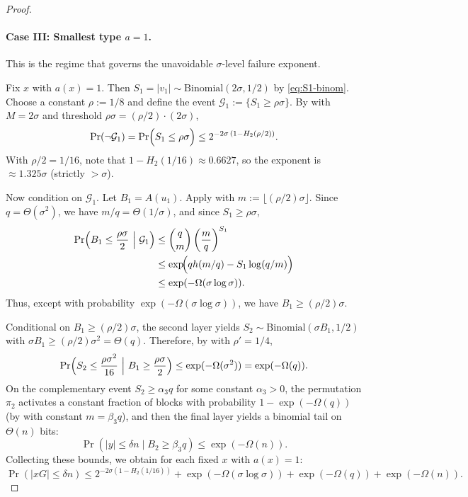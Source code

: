 \begin{proof}
\paragraph{Case III: Smallest type $a=1$.}
This is the regime that governs the unavoidable $\sigma$-level failure exponent.

Fix $x$ with $a(x)=1$.
Then $S_1=|v_1|\sim \mathrm{Binomial}(2\sigma,1/2)$ by \eqref{eq:S1-binom}.
Choose a constant $\rho:=1/8$ and define the event $\mathcal G_1:=\{S_1\ge \rho\sigma\}$.
By  with $M=2\sigma$ and threshold $\rho\sigma = (\rho/2)\cdot(2\sigma)$,
\begin{equation}\label{eq:caseIII_S1small}
\Pr(\neg \mathcal G_1)
=\Pr\Bigl(S_1\le \rho\sigma\Bigr)
\le 2^{-2\sigma\,(1-H_2(\rho/2))}.
\end{equation}
With $\rho/2=1/16$, note that $1-H_2(1/16)\approx 0.6627$, so the exponent is $\approx 1.325\sigma$ (strictly $> \sigma$).

Now condition on $\mathcal G_1$.
Let $B_1=A(u_1)$.
Apply  with $m:=\lfloor (\rho/2)\sigma\rfloor$.
Since $q=\Theta(\sigma^2)$, we have $m/q=\Theta(1/\sigma)$, and since $S_1\ge \rho\sigma$,
\begin{align*}
\Pr\Bigl(B_1 \le \frac{\rho\sigma}{2} \ \Big|\ \mathcal{G}_1\Bigr)
    &\le \binom{q}{m} \left(\frac{m}{q}\right)^{S_1} \\
    &\le \exp\!\Bigl( qh(m/q) - S_1 \log(q/m) \Bigr) \\
    &\le \exp(-\Omega(\sigma \log \sigma)).
\end{align*}
Thus, except with probability $\exp(-\Omega(\sigma\log\sigma))$, we have $B_1\ge (\rho/2)\sigma$.

Conditional on $B_1\ge (\rho/2)\sigma$, the second layer yields
$S_2\sim \mathrm{Binomial}(\sigma B_1,1/2)$ with $\sigma B_1\ge (\rho/2)\sigma^2=\Theta(q)$.
Therefore, by  with $\rho'=1/4$,
\[
\Pr\Bigl(S_2\le \frac{\rho\sigma^2}{16}\ \Big|\ B_1\ge \frac{\rho\sigma}{2}\Bigr)
\le \exp(-\Omega(\sigma^2))=\exp(-\Omega(q)).
\]
On the complementary event $S_2\ge \alpha_3 q$ for some constant $\alpha_3>0$,
the permutation $\pi_2$ activates a constant fraction of blocks with probability $1-\exp(-\Omega(q))$
(by  with constant $m=\beta_3 q$),
and then the final layer yields a binomial tail on $\Theta(n)$ bits:
\[
\Pr(|y|\le \delta n\mid B_2\ge \beta_3 q)\le \exp(-\Omega(n)).
\]
Collecting these bounds, we obtain for each fixed $x$ with $a(x)=1$:
\[
\Pr(|xG|\le \delta n)
\le 2^{-2\sigma(1-H_2(1/16))} + \exp(-\Omega(\sigma\log\sigma))+\exp(-\Omega(q))+\exp(-\Omega(n)).
\]


\end{proof}
